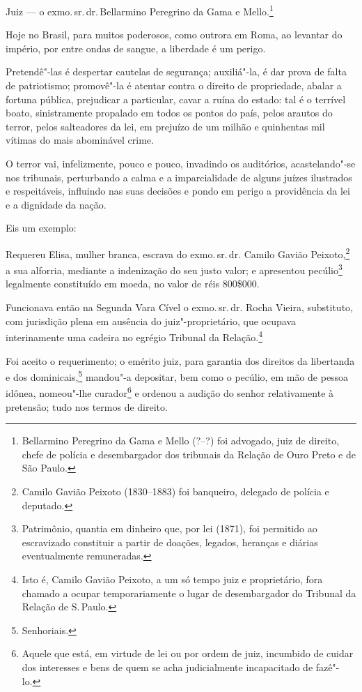 Juiz --- o exmo.\,sr.\,dr.\,Bellarmino Peregrino da Gama e
Mello.\footnote{Bellarmino Peregrino da Gama e Mello (?--?) foi
  advogado, juiz de direito, chefe de polícia e desembargador dos
  tribunais da Relação de Ouro Preto e de São Paulo.}\smallskip

Hoje no Brasil, para muitos poderosos, como outrora em Roma, ao levantar
do império, por entre ondas de sangue, a liberdade é um perigo.

Pretendê"-las é despertar cautelas de segurança; auxiliá"-la, é dar prova
de falta de patriotismo; promovê"-la é atentar contra o direito de
propriedade, abalar a fortuna pública, prejudicar a particular, cavar a
ruína do estado: tal é o terrível boato, sinistramente propalado em
todos os pontos do país, pelos arautos do terror, pelos salteadores da
lei, em prejuízo de um milhão e quinhentas mil vítimas do mais
abominável crime.

O terror vai, infelizmente, pouco e pouco, invadindo os auditórios,
acastelando"-se nos tribunais, perturbando a calma e a imparcialidade de
alguns juízes ilustrados e respeitáveis, influindo nas suas decisões e
pondo em perigo a providência da lei e a dignidade da nação.

Eis um exemplo:

Requereu Elisa, mulher branca, escrava do exmo.\,sr.\,dr. Camilo Gavião
Peixoto,\footnote{Camilo Gavião Peixoto (1830--1883) foi banqueiro,
  delegado de polícia e deputado.} a sua alforria, mediante a
indenização do seu justo valor; e apresentou pecúlio\footnote{
  Patrimônio, quantia em dinheiro que, por lei (1871), foi permitido ao
  escravizado constituir a partir de doações, legados, heranças e
  diárias eventualmente remuneradas.} legalmente constituído em moeda,
no valor de réis 800\$000.

Funcionava então na Segunda Vara Cível o exmo.\,sr.\,dr. Rocha Vieira,
substituto, com jurisdição plena em ausência do juiz"-proprietário, que
ocupava interinamente uma cadeira no egrégio Tribunal da
Relação.\footnote{Isto é, Camilo Gavião Peixoto, a um só tempo juiz e
  proprietário, fora chamado a ocupar temporariamente o lugar de
  desembargador do Tribunal da Relação de S.\,Paulo.}

Foi aceito o requerimento; o emérito juiz, para garantia dos direitos da
libertanda e dos dominicais,\footnote{Senhoriais.} mandou"-a depositar,
bem como o pecúlio, em mão de pessoa idônea, nomeou"-lhe
curador\footnote{Aquele que está, em virtude de lei ou por ordem de
  juiz, incumbido de cuidar dos interesses e bens de quem se acha
  judicialmente incapacitado de fazê"-lo.} e ordenou a audição do senhor
relativamente à pretensão; tudo nos termos de direito.

